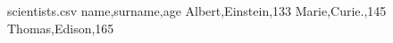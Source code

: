 \usepackage{pgfplots}
\pgfplotsset{width=7cm,compat=1.8}
\usepackage{pgfplotstable}

\begin{filecontents*}{scientists.csv}
name,surname,age
Albert,Einstein,133
Marie,Curie.,145
Thomas,Edison,165
\end{filecontents*}

\mytable
\def\getcell#1#2#3{
\pgfplotstablegetelem{#1}{#2}\of{#3}\pgfplotsretval%
}
